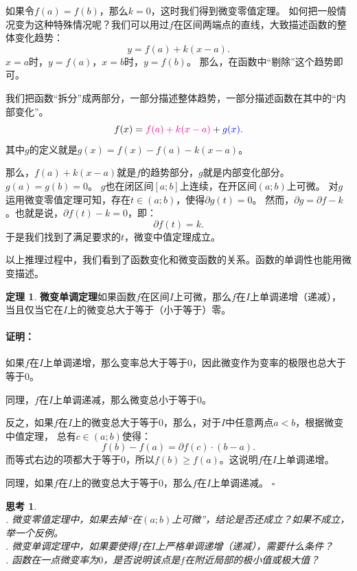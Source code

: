 \documentclass[12pt,UTF8]{ctexbook}
\theoremstyle{definition}
\newtheorem{tm}{定理}[section]
\theoremstyle{plain}
\newtheorem{sk}{思考}[section]
\renewenvironment{proof}{\paragraph{\textbf{证明：}}}{\hfill$\square$}
\begin{document}
如果令$f(a) = f(b)$，那么$k=0$，这时我们得到微变零值定理。
如何把一般情况变为这种特殊情况呢？我们可以用过$f$在区间两端点的直线，大致描述函数的整体变化趋势：
$$ y = f(a) + k(x - a).$$
$x = a$时，$y = f(a)$，$x = b$时，$y = f(b)$。
那么，在函数中“剔除”这个趋势即可。

我们把函数“拆分”成两部分，一部分描述整体趋势，一部分描述函数在其中的“内部变化”。
$$ f(x) = {\color{magenta} f(a) + k(x - a)} + {\color{blue} g(x)}. $$
其中$g$的定义就是$g(x) = f(x) - f(a) - k(x - a)$。

那么，$f(a) + k(x - a)$就是$f$的趋势部分，$g$就是内部变化部分。$g(a) = g(b) = 0$。
$g$也在闭区间$[a; b]$上连续，在开区间$(a; b)$上可微。
对$g$运用微变零值定理可知，存在$t\in(a;b)$，使得$\partial g(t) = 0$。
然而，$\partial g = \partial f - k$。也就是说，$ \partial f(t) - k = 0$，即：
$$ \partial f(t) = k.$$
于是我们找到了满足要求的$t$，微变中值定理成立。

以上推理过程中，我们看到了函数变化和微变函数的关系。函数的单调性也能用微变描述。
\begin{tm}{\textbf{微变单调定理}}\label{tm:2-4-20}
    如果函数$f$在区间$I$上可微，那么$f$在$I$上单调递增（递减），
    当且仅当它在$I$上的微变总大于等于（小于等于）零。
\end{tm}

\begin{proof}
    如果$f$在$I$上单调递增，那么变率总大于等于$0$，因此微变作为变率的极限也总大于等于$0$。
    
    同理，$f$在$I$上单调递减，那么微变总小于等于$0$。

    反之，如果$f$在$I$上的微变总大于等于$0$，那么，对于$I$中任意两点$a < b$，根据微变中值定理，
    总有$c\in(a; b)$使得：
    $$f(b) - f(a) = \partial f(c) \cdot (b - a).$$
    而等式右边的项都大于等于$0$，所以$f(b) \geqslant f(a)$。这说明$f$在$I$上单调递增。
    
    同理，如果$f$在$I$上的微变总大于等于$0$，那么$f$在$I$上单调递减。
\end{proof}

\begin{sk}
    \mbox{} \\
    . 微变零值定理中，如果去掉“在$(a; b)$上可微”，结论是否还成立？如果不成立，举一个反例。\\
    . 微变单调定理中，如果要使得$f$在$I$上严格单调递增（递减），需要什么条件？\\
    . 函数在一点微变率为$0$，是否说明该点是$f$在附近局部的极小值或极大值？
\end{sk}
\end{document}
